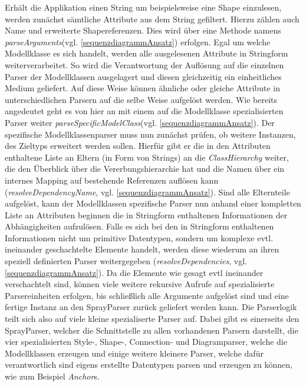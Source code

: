 \begin{figure}[htb]
\end{figure}Erhält die Applikation einen String um beispielsweise eine Shape einzulesen, werden zunächst sämtliche Attribute aus dem String gefiltert. Hierzu zählen auch Name und erweiterte Shapereferenzen. Dies wird über eine Methode namens \textit{parseArguments}(vgl. \ref{sequenzdiagrammAnsatz}) erfolgen. Egal um welche Modellklasse es sich handelt, werden alle ausgelesenen Attribute in Stringform weiterverarbeitet. So wird die Verantwortung der Auflösung auf die einzelnen Parser der Modellklassen ausgelagert und diesen gleichzeitig ein einheitliches Medium geliefert. Auf diese Weise können ähnliche oder gleiche Attribute in unterschiedlichen Parsern auf die selbe Weise aufgelöst werden. Wie bereits angedeutet geht es von hier an mit einem auf die Modellklasse spezialisierten Parser weiter \textit{parseSpecificModelClass}(vgl. \ref{sequenzdiagrammAnsatz}). Der spezifische Modellklassenparser muss nun zunächst prüfen, ob weitere Instanzen, des Zieltyps erweitert werden sollen. Hierfür gibt er die in den Attributen enthaltene Liste an Eltern (in Form von Strings) an die \textit{ClassHierarchy} weiter, die den Überblick über die Vererbungshierarchie hat und die Namen über ein internes Mapping auf bestehende Referenzen auflösen kann (\textit{resolveDependencyName}, vgl. \ref{sequenzdiagrammAnsatz}). Sind alle Elternteile aufgelöst, kann der Modellklassen spezifische Parser nun anhand einer kompletten Liste an Attributen beginnen die in Stringform enthaltenen Informationen der Abhängigkeiten aufzulösen.
Falls es sich bei den in Stringform enthaltenen Informationen nicht um primitive Datentypen, sondern um komplexe evtl. ineinander geschachtelte Elemente handelt, werden diese wiederum an ihren speziell definierten Parser weitergegeben (\textit{resolveDependencies}, vgl. \ref{sequenzdiagrammAnsatz}). Da die Elemente wie gesagt evtl ineinander verschachtelt sind, können viele weitere rekursive Aufrufe auf spezialisierte Parsereinheiten erfolgen, bis schließlich alle Argumente aufgelöst sind und eine fertige Instanz an den SprayParser zurück geliefert werden kann. Die Parserlogik teilt sich also auf viele kleine spezialiserte Parser auf. Dabei gibt es einerseits den SprayParser, welcher die Schnittstelle zu allen vorhandenen Parsern darstellt, die vier spezialisierten Style-, Shape-, Connection- und Diagramparser, welche die Modellklassen erzeugen und einige weitere kleinere Parser, welche dafür verantwortlich sind eigens erstellte Datentypen parsen und erzeugen zu können, wie zum Beispiel \textit{Anchor}s. 
